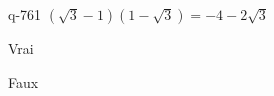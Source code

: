 \begin{truefalse}{q-761}
$(\sqrt{3}-1)(1-\sqrt{3})=-4-2\sqrt{3}$
\item Vrai
\item* Faux
\end{truefalse}

